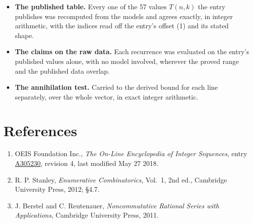 \documentclass[11pt]{article}
\theoremstyle{definition}
\begin{document}
\begin{itemize}

\item {\bfseries The published table.} Every one of the 57 values $T(n,k)$ the entry publishes was recomputed from the models and agrees exactly, in integer arithmetic, with the indices read off the entry's offset (1) and its stated shape.

\item {\bfseries The claims on the raw data.} Each recurrence was evaluated on the entry's published values alone, with no model involved, wherever the proved range and the published data overlap.

\item {\bfseries The annihilation test.} Carried to the derived bound for each line separately, over the whole vector, in exact integer arithmetic.

\end{itemize}

\section{References}

\begin{enumerate}

\item OEIS Foundation Inc., \emph{The On-Line Encyclopedia of Integer Sequences}, entry \href{https://oeis.org/A305230}{A305230}, revision 4, last modified May 27 2018.

\item R. P. Stanley, \emph{Enumerative Combinatorics}, Vol.~1, 2nd ed., Cambridge University Press, 2012; \S4.7.

\item J. Berstel and C. Reutenauer, \emph{Noncommutative Rational Series with Applications}, Cambridge University Press, 2011.

\end{enumerate}
\end{document}
